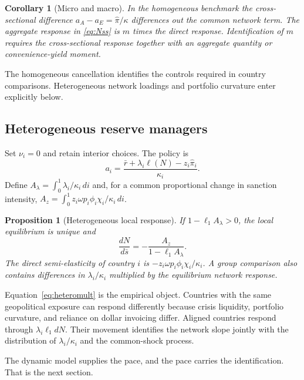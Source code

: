 \documentclass[11pt]{article}
\newtheorem{proposition}{Proposition}
\newtheorem{corollary}{Corollary}
\theoremstyle{definition}
\begin{document}
\begin{corollary}[Micro and macro]\label{cor:micromacro}
In the homogeneous benchmark the cross-sectional difference $a_A-a_E=\hat\pi/\kappa$ differences out the common network term. The aggregate response in \eqref{eq:Nss} is $m$ times the direct response. Identification of $m$ requires the cross-sectional response together with an aggregate quantity or convenience-yield moment.
\end{corollary}

The homogeneous cancellation identifies the controls required in country comparisons. Heterogeneous network loadings and portfolio curvature enter explicitly below.

\subsection{Heterogeneous reserve managers}

Set $\nu_i=0$ and retain interior choices. The policy is
\begin{equation}
a_i=\frac{\bar r+\lambda_i\ell(N)-z_i\hat\pi_i}{\kappa_i}.
\label{eq:heteropolicy}
\end{equation}
Define $A_\lambda=\int_0^1\lambda_i/\kappa_i\,di$ and, for a common proportional change in sanction intensity, $A_z=\int_0^1 z_i\omega p_i\phi_i\chi_i/\kappa_i\,di$.

\begin{proposition}[Heterogeneous local response]\label{prop:hetero}
If $1-\ell_1A_\lambda>0$, the local equilibrium is unique and
\begin{equation}
\frac{dN}{d\bar s}=-\frac{A_z}{1-\ell_1A_\lambda}.
\label{eq:heteromult}
\end{equation}
The direct semi-elasticity of country $i$ is $-z_i\omega p_i\phi_i\chi_i/\kappa_i$. A group comparison also contains differences in $\lambda_i/\kappa_i$ multiplied by the equilibrium network response.
\end{proposition}

Equation~\eqref{eq:heteromult} is the empirical object. Countries with the same geopolitical exposure can respond differently because crisis liquidity, portfolio curvature, and reliance on dollar invoicing differ. Aligned countries respond through $\lambda_i\ell_1dN$. Their movement identifies the network slope jointly with the distribution of $\lambda_i/\kappa_i$ and the common-shock process.

The dynamic model supplies the pace, and the pace carries the identification. That is the next section.
\end{document}
